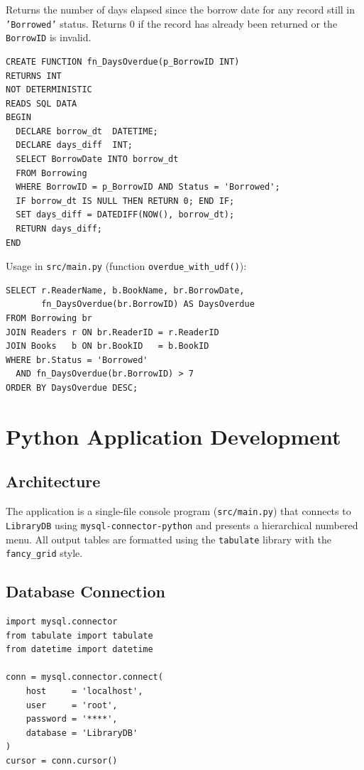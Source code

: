 \documentclass[12pt,a4paper,oneside]{report}
\begin{document}
Returns the number of days elapsed since the borrow date for any record
still in \texttt{'Borrowed'} status. Returns 0 if the record has already
been returned or the \texttt{BorrowID} is invalid.

\begin{lstlisting}[style=sqlstyle, caption={UDF: fn\_DaysOverdue}]
CREATE FUNCTION fn_DaysOverdue(p_BorrowID INT)
RETURNS INT
NOT DETERMINISTIC
READS SQL DATA
BEGIN
  DECLARE borrow_dt  DATETIME;
  DECLARE days_diff  INT;
  SELECT BorrowDate INTO borrow_dt
  FROM Borrowing
  WHERE BorrowID = p_BorrowID AND Status = 'Borrowed';
  IF borrow_dt IS NULL THEN RETURN 0; END IF;
  SET days_diff = DATEDIFF(NOW(), borrow_dt);
  RETURN days_diff;
END
\end{lstlisting}

Usage in \texttt{src/main.py} (function \texttt{overdue\_with\_udf()}):

\begin{lstlisting}[style=sqlstyle]
SELECT r.ReaderName, b.BookName, br.BorrowDate,
       fn_DaysOverdue(br.BorrowID) AS DaysOverdue
FROM Borrowing br
JOIN Readers r ON br.ReaderID = r.ReaderID
JOIN Books   b ON br.BookID   = b.BookID
WHERE br.Status = 'Borrowed'
  AND fn_DaysOverdue(br.BorrowID) > 7
ORDER BY DaysOverdue DESC;
\end{lstlisting}

\chapter{Python Application Development}

\section{Architecture}

The application is a single-file console program (\texttt{src/main.py}) that connects to
\texttt{LibraryDB} using \texttt{mysql-connector-python} and presents a hierarchical
numbered menu. All output tables are formatted using the \texttt{tabulate} library with
the \texttt{fancy\_grid} style.

\section{Database Connection}

\begin{lstlisting}[style=pythonstyle]
import mysql.connector
from tabulate import tabulate
from datetime import datetime

conn = mysql.connector.connect(
    host     = 'localhost',
    user     = 'root',
    password = '****',
    database = 'LibraryDB'
)
cursor = conn.cursor()
\end{lstlisting}
\end{document}
